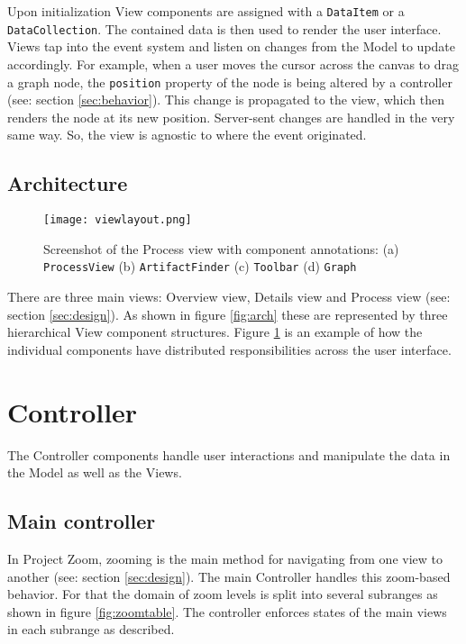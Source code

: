 Upon initialization View components are assigned with a \texttt{DataItem} or a \texttt{DataCollection}. The contained data is then used to render the user interface. Views tap into the event system and listen on changes from the Model to update accordingly. For example, when a user moves the cursor across the canvas to drag a graph node, the \texttt{position} property of the node is being altered by a controller (see: section \ref{sec:behavior}). This change is propagated to the view, which then renders the node at its new position. Server-sent changes are handled in the very same way. So, the view is agnostic to where the event originated.

\subsection{Architecture}

\begin{figure}
\texttt{[image: viewlayout.png]}
\caption[Screenshot of the Process view with component annotations]{Screenshot of the Process view with component annotations: (a) \texttt{ProcessView} \quad (b) \texttt{ArtifactFinder} \quad (c) \texttt{Toolbar} \quad (d) \texttt{Graph}}
\label{fig:viewlayout}
\end{figure}

There are three main views: Overview view, Details view and Process view (see: section \ref{sec:design}). As shown in figure \ref{fig:arch} these are represented by three hierarchical View component structures. Figure \ref{fig:viewlayout} is an example of how the individual components have distributed responsibilities across the user interface.

\section{Controller}

The Controller components handle user interactions and manipulate the data in the Model as well as the Views.

\subsection{Main controller}
In Project Zoom, zooming is the main method for navigating from one view to another (see: section \ref{sec:design}). The main Controller handles this zoom-based behavior. For that the domain of zoom levels is split into several subranges as shown in figure \ref{fig:zoomtable}. The controller enforces states of the main views in each subrange as described.

